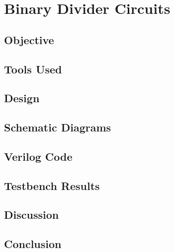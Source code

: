 \documentclass[12pt, titlepage]{report}
\begin{document}
\chapter{Binary Divider Circuits}

\section{Objective}
\section{Tools Used}
\section{Design}
\section{Schematic Diagrams}
\section{Verilog Code}
\section{Testbench Results}
\section{Discussion}
\section{Conclusion}
\end{document}
